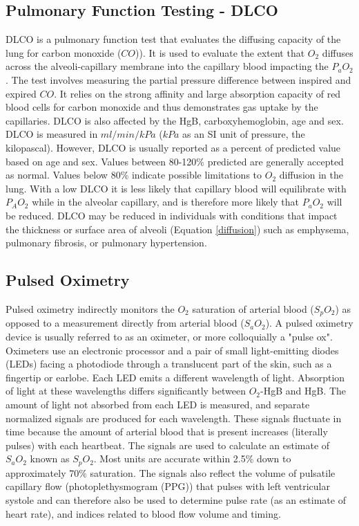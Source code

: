 \subsection{Pulmonary Function Testing - DLCO}
DLCO is a pulmonary function test that evaluates the diffusing capacity of the lung for carbon monoxide ($CO$)). It is used to evaluate the extent that $O_2$ diffuses across the alveoli-capillary membrane into the capillary blood impacting the $P_aO_2$. The test involves measuring the partial pressure difference between inspired and expired $CO$. It relies on the strong affinity and large absorption capacity of red blood cells for carbon monoxide and thus demonstrates gas uptake by the capillaries. DLCO is also affected by the HgB, carboxyhemoglobin, age and sex. DLCO is measured in $ml/min/kPa$ ($kPa$ as an SI unit of pressure, the kilopascal). However, DLCO is usually reported as a percent of predicted value based on age and sex. Values between 80-120\% predicted are generally accepted as normal. Values below 80\% indicate possible limitations to $O_2$ diffusion in the lung. With a low DLCO it is less likely that capillary blood will equilibrate with $P_AO_2$ while in the alveolar capillary, and is therefore more likely that $P_aO_2$ will be reduced.
DLCO may be reduced in individuals with conditions that impact the thickness or surface area of alveoli (Equation \ref{diffusion}) such as emphysema, pulmonary fibrosis, or pulmonary hypertension.

\subsection{Pulsed Oximetry}

Pulsed oximetry indirectly monitors the $O_2$ saturation of arterial blood ($S_pO_2$) as opposed to a measurement directly from arterial blood ($S_aO_2$). A pulsed oximetry device is usually referred to as an oximeter, or more colloquially a "pulse ox". 
Oximeters use an electronic processor and a pair of small light-emitting diodes (LEDs) facing a photodiode through a translucent part of the skin, such as a fingertip or earlobe. Each LED emits a different wavelength of light. Absorption of light at these wavelengths differs significantly between $O_2$-HgB and HgB. The amount of light not absorbed from each LED is measured, and separate normalized signals are produced for each wavelength. These signals fluctuate in time because the amount of arterial blood that is present increases (literally pulses) with each heartbeat. The signals are used to calculate an estimate of $S_aO_2$ known as $S_pO_2$. Most units are accurate within 2.5\% down to approximately 70\% saturation. The signals also reflect the volume of pulsatile capillary flow (photoplethysmogram (PPG)) that pulses with left ventricular systole and can therefore also be used to determine pulse rate (as an estimate of heart rate), and indices related to blood flow volume and timing.

